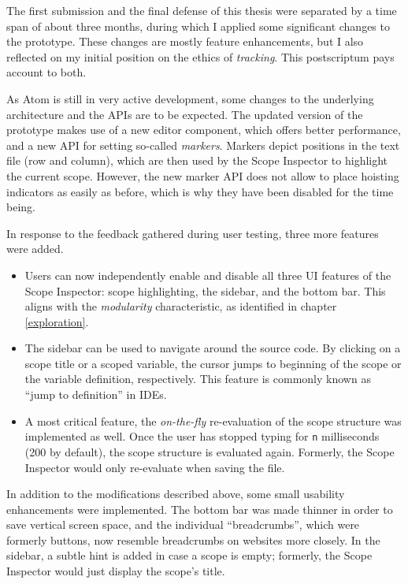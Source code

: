 The first submission and the final defense of this thesis were separated
by a time span of about three months, during which I applied some
significant changes to the prototype. These changes are mostly feature
enhancements, but I also reflected on my initial position on the ethics
of \emph{tracking}. This postscriptum pays account to both.

As Atom is still in very active development, some changes to the
underlying architecture and the APIs are to be expected. The updated
version of the prototype makes use of a new editor component, which
offers better performance, and a new API for setting so-called
\emph{markers}. Markers depict positions in the text file (row and
column), which are then used by the Scope Inspector to highlight the
current scope. However, the new marker API does not allow to place
hoisting indicators as easily as before, which is why they have been
disabled for the time being.

In response to the feedback gathered during user testing, three more
features were added.

\begin{itemize}
\itemsep1pt\parskip0pt
\item
  Users can now independently enable and disable all three UI features
  of the Scope Inspector: scope highlighting, the sidebar, and the
  bottom bar. This aligns with the \emph{modularity} characteristic, as
  identified in chapter \ref{exploration}.
\item
  The sidebar can be used to navigate around the source code. By
  clicking on a scope title or a scoped variable, the cursor jumps to
  beginning of the scope or the variable definition, respectively. This
  feature is commonly known as “jump to definition” in IDEs.
\item
  A most critical feature, the \emph{on-the-fly} re-evaluation of the
  scope structure was implemented as well. Once the user has stopped
  typing for \texttt{n} milliseconds (200 by default), the scope
  structure is evaluated again. Formerly, the Scope Inspector would only
  re-evaluate when saving the file.
\end{itemize}

In addition to the modifications described above, some small usability
enhancements were implemented. The bottom bar was made thinner in order
to save vertical screen space, and the individual “breadcrumbs”, which
were formerly buttons, now resemble breadcrumbs on websites more
closely. In the sidebar, a subtle hint is added in case a scope is
empty; formerly, the Scope Inspector would just display the scope’s
title.

